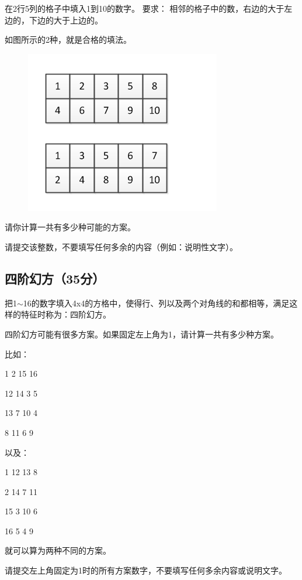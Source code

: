 \documentclass[a4paper, 12pt, twocolumn]{ctexart}
\begin{document}
	在2行5列的格子中填入1到10的数字。
	要求：
	相邻的格子中的数，右边的大于左边的，下边的大于上边的。
	
	如图所示的2种，就是合格的填法。
	
	\begin{figure}[H]
		\centering
		\includegraphics[width=.8\linewidth]{003.png}
	\end{figure}
	
	请你计算一共有多少种可能的方案。
	
	请提交该整数，不要填写任何多余的内容（例如：说明性文字）。
	
	\subsection{四阶幻方（35分）}
	
	把1$\sim$16的数字填入4x4的方格中，使得行、列以及两个对角线的和都相等，满足这样的特征时称为：四阶幻方。
	
	四阶幻方可能有很多方案。如果固定左上角为1，请计算一共有多少种方案。
	
	比如：
	
	1  2 15 16
	
	12 14  3  5
	
	13  7 10  4
	
	8 11  6  9
	
	以及：
	
	1 12 13  8
	
	2 14  7 11
	
	15  3 10  6
	
	16  5  4  9
	
	就可以算为两种不同的方案。
	
	请提交左上角固定为1时的所有方案数字，不要填写任何多余内容或说明文字。
	
\end{document}
